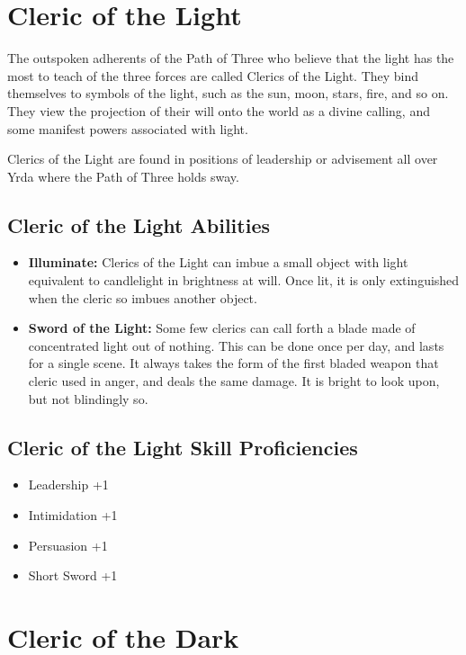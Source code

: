\begin{multicols}{2}
\section{Cleric of the Light}

The outspoken adherents of the Path of Three who believe that the
light has the most to teach of the three forces are called Clerics
of the Light. They bind themselves to symbols of the light, such as
the sun, moon, stars, fire, and so on. They view the projection of
their will onto the world as a divine calling, and some manifest
powers associated with light.

Clerics of the Light are found in positions of leadership or advisement
all over Yrda where the Path of Three holds sway.

\subsection{Cleric of the Light Abilities}

\begin{itemize}
  \item \textbf{Illuminate:} Clerics of the Light can imbue a small object
    with light equivalent to candlelight in brightness at will. Once lit,
    it is only extinguished when the cleric so imbues another object.
  \item \textbf{Sword of the Light:} Some few clerics can call forth a
    blade made of concentrated light out of nothing. This can be done once
    per day, and lasts for a single scene. It always takes the form of the
    first bladed weapon that cleric used in anger, and deals the same damage.
    It is bright to look upon, but not blindingly so.
\end{itemize}

\subsection{Cleric of the Light Skill Proficiencies}

\begin{itemize}
  \item Leadership +1
  \item Intimidation +1
  \item Persuasion +1
  \item Short Sword +1
\end{itemize}

\section{Cleric of the Dark}


\end{multicols}
